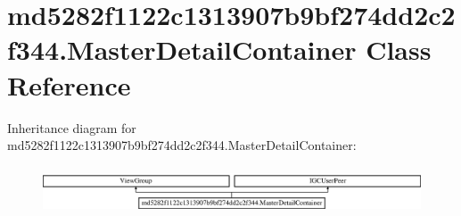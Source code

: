 \hypertarget{classmd5282f1122c1313907b9bf274dd2c2f344_1_1MasterDetailContainer}{}\section{md5282f1122c1313907b9bf274dd2c2f344.\+Master\+Detail\+Container Class Reference}
\label{classmd5282f1122c1313907b9bf274dd2c2f344_1_1MasterDetailContainer}
Inheritance diagram for md5282f1122c1313907b9bf274dd2c2f344.\+Master\+Detail\+Container\+:\begin{figure}[H]
\begin{center}
\leavevmode
\includegraphics[height=1.443299cm]{classmd5282f1122c1313907b9bf274dd2c2f344_1_1MasterDetailContainer}
\end{center}
\end{figure}
